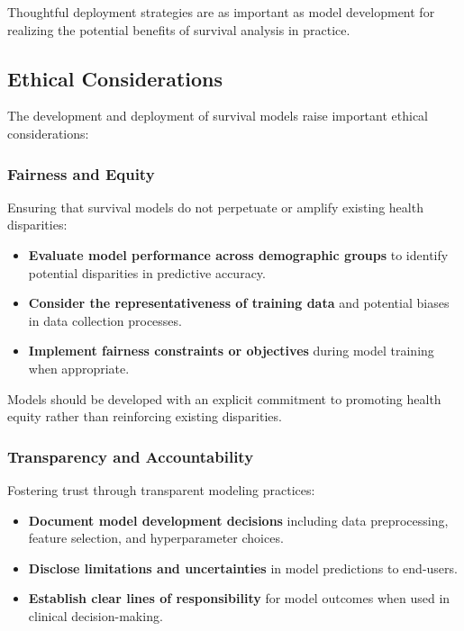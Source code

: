 Thoughtful deployment strategies are as important as model development for realizing the potential benefits of survival analysis in practice.

\subsection{Ethical Considerations}

The development and deployment of survival models raise important ethical considerations:

\subsubsection{Fairness and Equity}

Ensuring that survival models do not perpetuate or amplify existing health disparities:

\begin{itemize}
    \item \textbf{Evaluate model performance across demographic groups} to identify potential disparities in predictive accuracy.

    \item \textbf{Consider the representativeness of training data} and potential biases in data collection processes.

    \item \textbf{Implement fairness constraints or objectives} during model training when appropriate.
\end{itemize}

Models should be developed with an explicit commitment to promoting health equity rather than reinforcing existing disparities.

\subsubsection{Transparency and Accountability}

Fostering trust through transparent modeling practices:

\begin{itemize}
    \item \textbf{Document model development decisions} including data preprocessing, feature selection, and hyperparameter choices.

    \item \textbf{Disclose limitations and uncertainties} in model predictions to end-users.

    \item \textbf{Establish clear lines of responsibility} for model outcomes when used in clinical decision-making.
\end{itemize}

